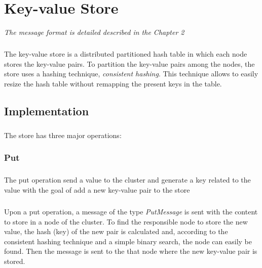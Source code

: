 \documentclass{report}
\begin{document}
				\begin{center}
				\end{center}
				
	\chapter{Key-value Store}
			\emph{The message format is detailed described in the Chapter 2}
	
	        \paragraph{} The key-value store is a distributed partitioned hash 
			table in which each node stores the key-value pairs.
			To partition the key-value pairs among the nodes, the store uses a hashing
			technique, \emph{consistent hashing}. This technique allows to easily resize the
			hash table without remapping the present keys in the table.
	        
			\section{Implementation}

				\paragraph{} The store has three major operations:
				
				\subsection{Put}
					\paragraph{} The put operation send a value to the cluster and generate a key
					related to the value with the goal of add a new key-value pair to the store

					\paragraph{} Upon a put operation, a message of the type \emph{PutMessage}
					is sent with the content to store in a node of the cluster. To find the
					responsible node to store the new value, the hash (key) of the new pair is 
					calculated and, according to the consistent hashing technique and a 
					simple binary search, the node can easily be found. Then the message is
					sent to the that node where the new key-value pair is stored.
\end{document}
